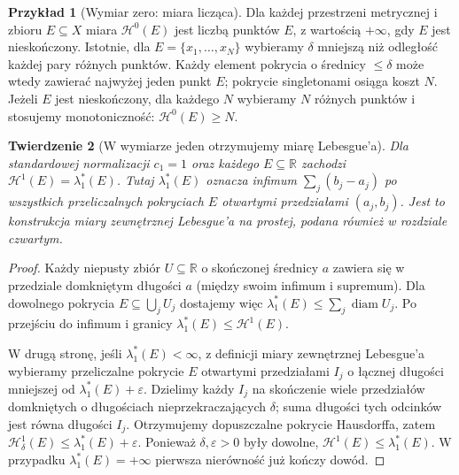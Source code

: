 \documentclass[11pt,a4paper,oneside]{book}
\numberwithin{equation}{chapter}
\theoremstyle{plain}
\newtheorem{twierdzenie}{Twierdzenie}[chapter]
\theoremstyle{definition}
\newtheorem{przyklad}[twierdzenie]{Przykład}
\theoremstyle{remark}
\begin{document}
\begin{przyklad}[Wymiar zero: miara licząca]
\label{prz:hausdorff-counting-26}
Dla każdej przestrzeni metrycznej i zbioru $E\subseteq X$
miara $\mathcal H^0(E)$ jest liczbą punktów $E$,
z wartością $+\infty$, gdy $E$ jest nieskończony.
Istotnie, dla $E=\{x_1,\ldots,x_N\}$
wybieramy $\delta$ mniejszą niż odległość
każdej pary różnych punktów.
Każdy element pokrycia o średnicy $\leq\delta$
może wtedy zawierać najwyżej jeden punkt $E$;
pokrycie singletonami osiąga koszt $N$.
Jeżeli $E$ jest nieskończony, dla każdego $N$
wybieramy $N$ różnych punktów i stosujemy
monotoniczność: $\mathcal H^0(E)\geq N$.
\end{przyklad}

\begin{twierdzenie}[W wymiarze jeden otrzymujemy miarę Lebesgue'a]
\label{thm:hausdorff-line-26}
Dla standardowej normalizacji $c_1=1$ oraz
każdego $E\subseteq\mathbb R$ zachodzi
$\mathcal H^1(E)=\lambda_1^*(E)$.
Tutaj $\lambda_1^*(E)$ oznacza infimum
$\sum_j(b_j-a_j)$ po wszystkich przeliczalnych
pokryciach $E$ otwartymi przedziałami $(a_j,b_j)$.
Jest to konstrukcja miary zewnętrznej Lebesgue'a
na prostej, podana również w rozdziale czwartym.
\end{twierdzenie}
\begin{proof}
Każdy niepusty zbiór $U\subseteq\mathbb R$
o skończonej średnicy $a$ zawiera się w przedziale
domkniętym długości $a$ (między swoim infimum
i supremum). Dla dowolnego pokrycia
$E\subseteq\bigcup_jU_j$ dostajemy więc
$\lambda_1^*(E)\leq\sum_j\operatorname{diam}U_j$.
Po przejściu do infimum i granicy
$\lambda_1^*(E)\leq\mathcal H^1(E)$.

W drugą stronę, jeśli $\lambda_1^*(E)<\infty$,
z definicji miary zewnętrznej Lebesgue'a
wybieramy przeliczalne pokrycie $E$ otwartymi
przedziałami $I_j$ o łącznej długości
mniejszej od $\lambda_1^*(E)+\varepsilon$.
Dzielimy każdy $I_j$ na skończenie wiele
przedziałów domkniętych o długościach
nieprzekraczających $\delta$; suma długości
tych odcinków jest równa długości $I_j$.
Otrzymujemy dopuszczalne pokrycie Hausdorffa,
zatem $\mathcal H^1_\delta(E)\leq
\lambda_1^*(E)+\varepsilon$.
Ponieważ $\delta,\varepsilon>0$ były dowolne,
$\mathcal H^1(E)\leq\lambda_1^*(E)$.
W przypadku $\lambda_1^*(E)=+\infty$
pierwsza nierówność już kończy dowód.
\end{proof}
\end{document}
